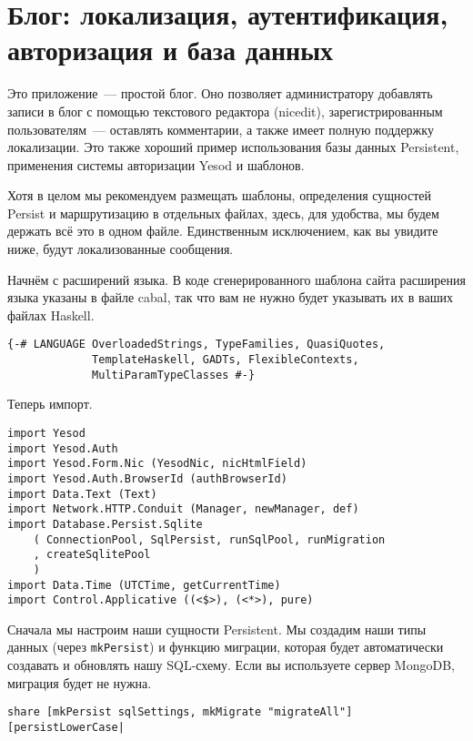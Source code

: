 ﻿\chapter{Блог: локализация, аутентификация, авторизация и база данных}
\label{chap:blog}

Это приложение~--- простой блог. Оно позволяет администратору добавлять записи в блог с помощью текстового редактора (nicedit), зарегистрированным пользователям~--- оставлять комментарии, а также имеет полную поддержку локализации. Это также хороший пример использования базы данных Persistent, применения системы авторизации Yesod и шаблонов.

Хотя в целом мы рекомендуем размещать шаблоны, определения сущностей Persist и маршрутизацию в отдельных файлах, здесь, для удобства, мы будем держать всё это в одном файле. Единственным исключением, как вы увидите ниже, будут локализованные сообщения.

Начнём с расширений языка. В коде сгенерированного шаблона сайта расширения языка указаны в файле cabal, так что вам не нужно будет указывать их в ваших файлах Haskell.

\begin{lstlisting}
{-# LANGUAGE OverloadedStrings, TypeFamilies, QuasiQuotes,
             TemplateHaskell, GADTs, FlexibleContexts,
             MultiParamTypeClasses #-}
\end{lstlisting}

Теперь импорт.

\begin{lstlisting}
import Yesod
import Yesod.Auth
import Yesod.Form.Nic (YesodNic, nicHtmlField)
import Yesod.Auth.BrowserId (authBrowserId)
import Data.Text (Text)
import Network.HTTP.Conduit (Manager, newManager, def)
import Database.Persist.Sqlite
    ( ConnectionPool, SqlPersist, runSqlPool, runMigration
    , createSqlitePool
    )
import Data.Time (UTCTime, getCurrentTime)
import Control.Applicative ((<$>), (<*>), pure)
\end{lstlisting}%

Сначала мы настроим наши сущности Persistent. Мы создадим наши типы данных (через \lstinline!mkPersist!) и функцию миграции, которая будет автоматически создавать и обновлять нашу SQL-схему. Если вы используете сервер MongoDB, миграция будет не нужна.

\begin{lstlisting}
share [mkPersist sqlSettings, mkMigrate "migrateAll"] [persistLowerCase|
\end{lstlisting}

